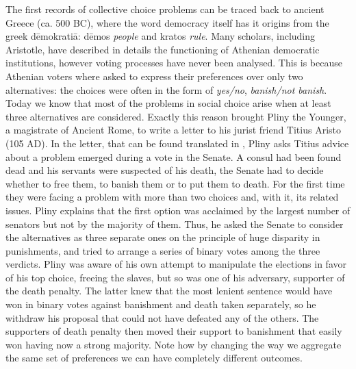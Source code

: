 The first records of collective choice problems can be traced back to ancient Greece (ca. 500 BC),
  where the word democracy itself has it origins from the greek dēmokratiā: dēmos \textit{people} and kratos \textit{rule}. 
Many scholars, including Aristotle, have described in details the functioning of Athenian democratic institutions, however voting processes have never been analysed. This is because Athenian voters where asked to express their preferences over only two alternatives: the choices were often in the form of \textit{yes/no}, \textit{banish/not banish}. 
Today we know that most of the problems in social choice arise when at least three alternatives are considered. Exactly this reason brought Pliny the Younger, a magistrate of Ancient Rome, to write a letter to his jurist friend Titius Aristo (105 AD). In the letter, that can be found translated in \citet[Chapter 2]{McLeanUrken1995}, Pliny asks Titius advice about a problem emerged during a vote in the Senate. A consul had been found dead and his servants were suspected of his death, the Senate had to decide whether to free them, to banish them or to put them to death. For the first time they were facing a problem with more than two choices 
and, with it, its related issues. Pliny explains that the first option was acclaimed by the largest number of senators but not by the majority of them. Thus, he asked the Senate to consider the alternatives as three separate ones on the principle of huge disparity in punishments, and tried to arrange a series of binary votes among the three verdicts. Pliny was aware of his own attempt to manipulate the elections in favor of his top choice, freeing the slaves, but so was one of his adversary, supporter of the death penalty. 
The latter knew that the most lenient sentence would have won in binary votes against banishment and death taken separately, so he withdraw his proposal that could not have defeated any of the others. The supporters of death penalty then moved their support to banishment that easily won having now a strong majority. Note how by changing the way we aggregate the same set of preferences we can have completely different outcomes.

